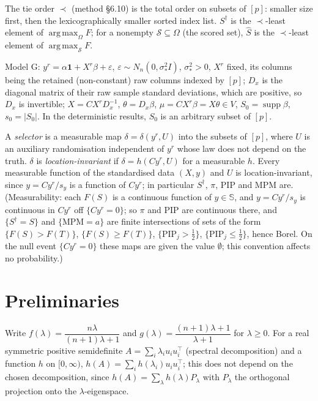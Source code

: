 \documentclass[11pt]{article}
\theoremstyle{remark}
\newcommand{\Sph}{\mathbb S}
\newcommand{\one}{\mathbf 1}
\newcommand{\PIP}{\mathrm{PIP}}
\newcommand{\MPM}{\mathrm{MPM}}
\newcommand{\sS}{\mathcal S}
\DeclareMathOperator*{\argmax}{arg\,max}
\begin{document}
The tie order $\prec$ (method \S6.10) is the total order on subsets of $[p]$: smaller size first, then the lexicographically smaller sorted index list. $S^\dagger$ is the $\prec$-least element of $\argmax_\Omega F$; for a nonempty $\sS\subseteq\Omega$ (the scored set), $\hat S$ is the $\prec$-least element of $\argmax_{\sS}F$.

Model G: $y^r=\alpha\one+X^r\beta+\varepsilon$, $\varepsilon\sim N_n(0,\sigma_*^2I)$, $\sigma_*^2>0$, $X^r$ fixed, its columns being the retained (non-constant) raw columns indexed by $[p]$; $D_x$ is the diagonal matrix of their raw sample standard deviations, which are positive, so $D_x$ is invertible; $X=CX^rD_x^{-1}$, $\theta=D_x\beta$, $\mu=CX^r\beta=X\theta\in V$, $S_0=\operatorname{supp}\beta$, $s_0=|S_0|$. In the deterministic results, $S_0$ is an arbitrary subset of $[p]$.

A \emph{selector} is a measurable map $\delta=\delta(y^r,U)$ into the subsets of $[p]$, where $U$ is an auxiliary randomisation independent of $y^r$ whose law does not depend on the truth. $\delta$ is \emph{location-invariant} if $\delta=h(Cy^r,U)$ for a measurable $h$. Every measurable function of the standardised data $(X,y)$ and $U$ is location-invariant, since $y=Cy^r/s_y$ is a function of $Cy^r$; in particular $S^\dagger$, $\pi$, $\PIP$ and $\MPM$ are. (Measurability: each $F(S)$ is a continuous function of $y\in\Sph$, and $y=Cy^r/s_y$ is continuous in $Cy^r$ off $\{Cy^r=0\}$; so $\pi$ and $\PIP$ are continuous there, and $\{S^\dagger=S\}$ and $\{\MPM=a\}$ are finite intersections of sets of the form $\{F(S)>F(T)\}$, $\{F(S)\ge F(T)\}$, $\{\PIP_j>\tfrac12\}$, $\{\PIP_j\le\tfrac12\}$, hence Borel. On the null event $\{Cy^r=0\}$ these maps are given the value $\emptyset$; this convention affects no probability.)

\section{Preliminaries}\label{sec:prelim}

Write $f(\lambda)=\dfrac{n\lambda}{(n+1)\lambda+1}$ and $g(\lambda)=\dfrac{(n+1)\lambda+1}{\lambda+1}$ for $\lambda\ge0$. For a real symmetric positive semidefinite $A=\sum_i\lambda_iu_iu_i^\top$ (spectral decomposition) and a function $h$ on $[0,\infty)$, $h(A)=\sum_ih(\lambda_i)u_iu_i^\top$; this does not depend on the chosen decomposition, since $h(A)=\sum_{\lambda}h(\lambda)P_\lambda$ with $P_\lambda$ the orthogonal projection onto the $\lambda$-eigenspace.
\end{document}
